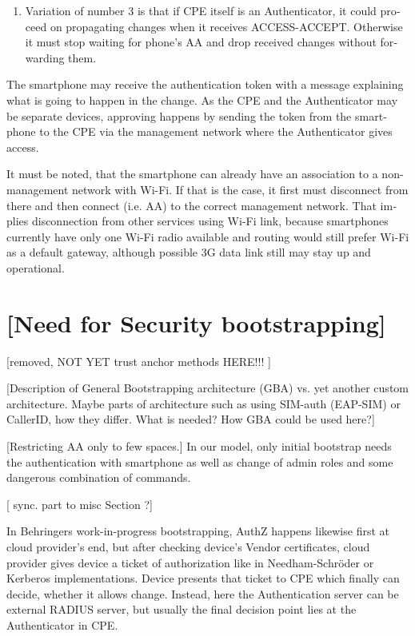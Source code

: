 \documentclass[12pt,a4paper,english]{tutthesis}
\begin{document}
\begin{otherlanguage}{english}
\begin{enumerate}
\item Variation of number 3 is that if CPE itself is an Authenticator, it
could proceed on propagating changes when it receives
ACCESS-ACCEPT. Otherwise it must stop waiting for phone's AA and
drop received changes without forwarding them.
\end{enumerate}




The smartphone may receive the authentication token with 
a message explaining what is going to happen in the change.
As the CPE and the Authenticator may be separate devices, approving
happens by sending the token from the smartphone to the CPE via the
management network where the Authenticator gives access.

It must be noted, that the smartphone can already have an association
to a non-management network with Wi-Fi. If that is the case, it first
must disconnect from there and then connect (i.e. AA) to the correct management
network. That implies disconnection from other services using Wi-Fi
link, because smartphones currently have only one Wi-Fi radio
available and routing would still prefer Wi-Fi as a default gateway, although
possible 3G data link still may stay up and operational.



\section{[Need for Security bootstrapping]}
\label{sec-4-4}
[removed, NOT YET trust anchor methods HERE!!! ]





[Description of General Bootstrapping architecture (GBA) vs. yet
another custom architecture. Maybe parts of architecture
such as using SIM-auth (EAP-SIM) or CallerID, how they differ. 
What is needed? How GBA could be used here?]

[Restricting AA only to few spaces.]
In our model, only initial bootstrap needs the authentication with
smartphone as well as change of admin roles and some dangerous
combination of commands.

[ sync. part to misc Section ?]


In Behringers work-in-progress  bootstrapping\cite{draft-behringer-bootstrap},
AuthZ happens likewise first at cloud provider's
end, but after checking device's Vendor certificates, cloud provider
gives device a ticket of authorization like in Needham-Schröder or
Kerberos implementations. Device presents that ticket to CPE which
finally can decide, whether it allows change. 
Instead, here the Authentication server can be external RADIUS server,
but usually the final decision point lies at the Authenticator in CPE.



\end{otherlanguage}
\end{document}
